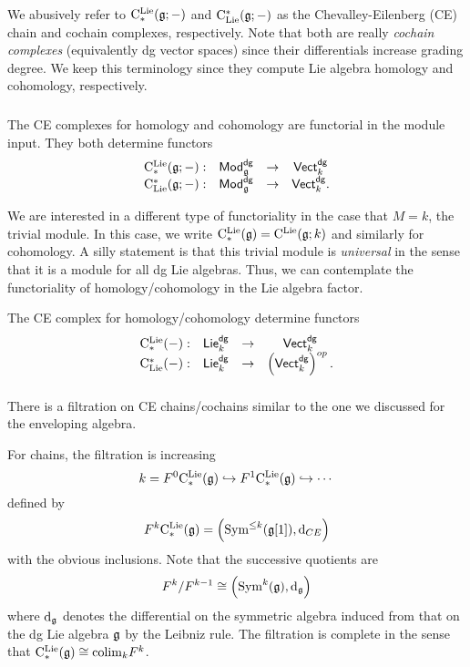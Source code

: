 \documentclass[11pt]{amsart}
\def\dgVect{{\sf Vect}^{\sf dg}}
\def\dgLie{{\sf Lie}^{\sf dg}}
\def\dgMod{{\sf Mod}^{\sf dg}}
\begin{document}
\begin{warn}
We abusively refer to ${\rm C}^{\rm Lie}_*(\mathfrak g ; -)$ and ${\rm C}_{{\rm Lie}}^*(\mathfrak g; -)$ as the Chevalley-Eilenberg (CE) chain and cochain complexes, respectively.
Note that both are really {\em cochain complexes} (equivalently dg vector spaces) since their differentials increase grading degree.
We keep this terminology since they compute Lie algebra homology and cohomology, respectively. 
\end{warn}

\subsubsection{}

The CE complexes for homology and cohomology are functorial in the module input.
They both determine functors
\[
\begin{array}{cccc}
\clieu_*(\fg ; -) : & \dgMod_\fg & \to & \dgVect_k\\
\clie^*(\fg ; -) : & \dgMod_{\fg} & \to & \dgVect_k .
\end{array}
\]

We are interested in a different type of functoriality in the case that $M = k$, the trivial module. 
In this case, we write ${\rm C}^{\rm Lie}_*(\mathfrak g) = {\rm C}^{\rm Lie}(\mathfrak g;k)$ and similarly for cohomology.
A silly statement is that this trivial module is {\em universal} in the sense that it is a module for all dg Lie algebras.
Thus, we can contemplate the functoriality of homology/cohomology in the Lie algebra factor. 

\begin{lem}
The CE complex for homology/cohomology determine functors
\[
\begin{array}{cccc}
\clieu_*(-) : & \dgLie_k & \to & \dgVect_k\\
\clie^*(-) : & \dgLie_k & \to & \left(\dgVect_k\right)^{op} .
\end{array}
\]
\end{lem}

\subsubsection{}

There is a filtration on CE chains/cochains similar to the one we discussed for the enveloping algebra.

For chains, the filtration is increasing 
\[
k = F^0 {\rm C}^{\rm Lie}_*(\mathfrak g) \hookrightarrow F^1 {\rm C}^{\rm Lie}_*(\mathfrak g) \hookrightarrow \cdots
\]
defined by
\[
F^{k} {\rm C}^{\rm Lie}_*(\mathfrak g) = \left({\rm Sym}^{\leq k} (\mathfrak g[1]) , {\rm d}_{CE}\right) 
\] 
with the obvious inclusions. 
Note that the successive quotients are
\[
F^k / F^{k-1} \cong \left({\rm Sym}^k(\mathfrak g) , {\rm d}_{\mathfrak g}\right)
\]
where ${\rm d}_{\mathfrak g}$ denotes the differential on the symmetric algebra induced from that on the dg Lie algebra $\mathfrak g$ by the Leibniz rule. 
The filtration is complete in the sense that ${\rm C}^{\rm Lie}_*(\mathfrak g) \cong {\rm colim}_{k} F^k$. 
\end{document}
